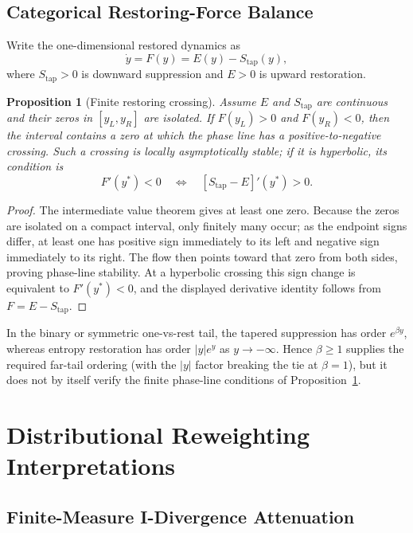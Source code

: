 \documentclass{article}
\theoremstyle{plain}
\newtheorem{proposition}[theorem]{Proposition}
\theoremstyle{definition}
\theoremstyle{remark}
\begin{document}
\subsection{Categorical Restoring-Force Balance}
\label{app:categorical_restoring_balance}

Write the one-dimensional restored dynamics as
\[
\dot y=F(y)=E(y)-S_{\mathrm{tap}}(y),
\]
where \(S_{\mathrm{tap}}>0\) is downward suppression and \(E>0\) is
upward restoration.

\begin{proposition}[Finite restoring crossing]
\label{prop:categorical_restoring_crossing}
Assume \(E\) and \(S_{\mathrm{tap}}\) are continuous and their zeros in
\([y_L,y_R]\) are isolated. If
\(F(y_L)>0\) and \(F(y_R)<0\), then the interval contains a zero at
which the phase line has a positive-to-negative crossing. Such a
crossing is locally asymptotically stable; if it is hyperbolic, its
condition is
\[
F'(y^*)<0
\quad\Longleftrightarrow\quad
[S_{\mathrm{tap}}-E]'(y^*)>0.
\]
\end{proposition}

\begin{proof}
The intermediate value theorem gives at least one zero. Because the
zeros are isolated on a compact interval, only finitely many occur; as
the endpoint signs differ, at least one has positive sign immediately
to its left and negative sign immediately to its right. The flow then
points toward that zero from both sides, proving phase-line stability. At a
hyperbolic crossing this sign change is equivalent to \(F'(y^*)<0\),
and the displayed derivative identity follows from \(F=E-S_{\mathrm{tap}}\).
\end{proof}

In the binary or symmetric one-vs-rest tail, the tapered suppression
has order \(e^{\beta y}\), whereas entropy restoration has order
\(|y|e^y\) as \(y\to-\infty\). Hence \(\beta\ge1\) supplies the
required far-tail ordering (with the \(|y|\) factor breaking the tie at
\(\beta=1\)), but it does not by itself verify the finite phase-line
conditions of Proposition~\ref{prop:categorical_restoring_crossing}.

\section{Distributional Reweighting Interpretations}
\label{app:distributional_reweighting}

\subsection{Finite-Measure I-Divergence Attenuation}
\label{app:finite_measure_variational}
\end{document}
